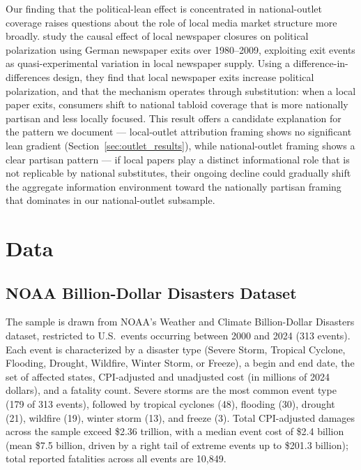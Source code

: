 \documentclass[12pt]{article}
\begin{document}
Our finding that the political-lean effect is concentrated in
national-outlet coverage raises questions about the role of local media
market structure more broadly.  \citet{ellger2024} study the causal
effect of local newspaper closures on political polarization using
German newspaper exits over 1980--2009, exploiting exit events as
quasi-experimental variation in local newspaper supply.  Using a
difference-in-differences design, they find that local newspaper exits
increase political polarization, and that the mechanism operates through
substitution: when a local paper exits, consumers shift to national
tabloid coverage that is more nationally partisan and less locally
focused.  This result offers a candidate explanation for the pattern
we document --- local-outlet attribution framing shows no significant
lean gradient (Section~\ref{sec:outlet_results}), while national-outlet
framing shows a clear partisan pattern --- if local papers play a
distinct informational role that is not replicable by national
substitutes, their ongoing decline could gradually shift the aggregate
information environment toward the nationally partisan framing that
dominates in our national-outlet subsample.


\section{Data}
\label{sec:data}

\subsection{NOAA Billion-Dollar Disasters Dataset}

The sample is drawn from NOAA's Weather and Climate Billion-Dollar
Disasters dataset, restricted to U.S.\ events occurring between 2000
and 2024 (313 events). Each event is characterized by a disaster type
(Severe Storm, Tropical Cyclone, Flooding, Drought, Wildfire, Winter
Storm, or Freeze), a begin and end date, the set of affected states,
CPI-adjusted and unadjusted cost (in millions of 2024 dollars), and a
fatality count. Severe storms are the most common event type (179 of
313 events), followed by tropical cyclones (48), flooding (30),
drought (21), wildfire (19), winter storm (13), and freeze (3). Total
CPI-adjusted damages across the sample exceed \$2.36 trillion, with a
median event cost of \$2.4 billion (mean \$7.5 billion, driven by a
right tail of extreme events up to \$201.3 billion); total reported
fatalities across all events are 10,849.
\end{document}
